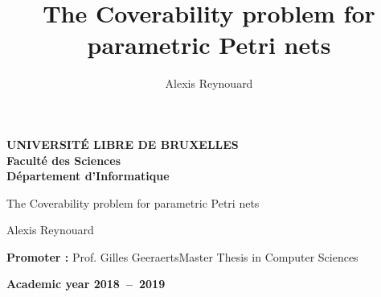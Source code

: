 \documentclass[11pt,a4paper,oneside]{book}
\title{The Coverability problem for parametric Petri nets}
\author{Alexis Reynouard}
\date{}
\theoremstyle{plain}
\theoremstyle{definition}
\theoremstyle{remark}
\begin{document}
\frontmatter
\begin{titlepage}
\setcounter{page}{0}
\begin{center}
\textbf{UNIVERSIT\'E LIBRE DE BRUXELLES}\\
\textbf{Faculté des Sciences}\\
\textbf{Département d'Informatique}
\vfill{}\vfill{}

{\Huge  The Coverability problem \vspace*{.5cm}  \linebreak[4] for parametric Petri nets}

{\Huge \par}
\begin{center}{\LARGE Alexis Reynouard}\end{center}{\Huge \par}
\vfill{}\vfill{}
\begin{flushright}{\large \textbf{Promoter :} Prof. Gilles Geeraerts}\hfill{}{\large Master Thesis in Computer Sciences}\\
{\large }\hfill{}{}\end{flushright}{\large\par}
\vfill{}\vfill{}\enlargethispage{3cm}
\textbf{Academic year 2018~--~2019}
\end{center}
\end{titlepage}
\newpage
\thispagestyle{empty}
\null

\newenvironment{vcenterpage}
{\newpage\thispagestyle{empty} 
\vspace*{\fill}}
{\vspace*{\fill}\par\pagebreak}

%
%
%
%
\end{document}
